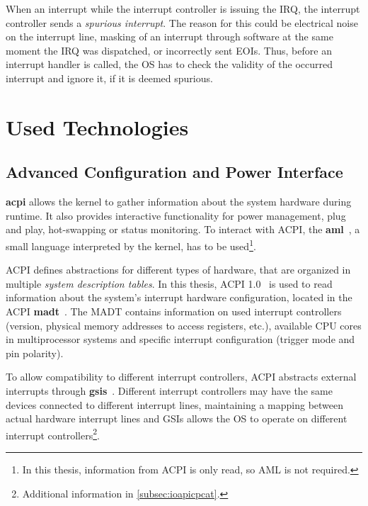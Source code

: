 When an interrupt  while the interrupt controller is issuing the IRQ, the interrupt controller sends a \textit{spurious interrupt}.
The reason for this could be electrical noise on the interrupt line, masking of an interrupt through software at the same moment the IRQ was dispatched, or incorrectly sent EOIs.
Thus, before an interrupt handler is called, the OS has to check the validity of the occurred interrupt and ignore it, if it is deemed spurious.

\section{Used Technologies}
\label{sec:technologies}

\subsection{Advanced Configuration and Power Interface}
\label{subsec:acpi}

\textbf{\gls{acpi}} allows the kernel to gather information about the system hardware during runtime.
It also provides interactive functionality for power management, plug and play, hot-swapping or status monitoring.
To interact with ACPI, the \textbf{\gls{aml}}~\autocite[sec.~16]{acpi1}, a small language interpreted by the kernel, has to be used\footnote{
  In this thesis, information from ACPI is only read, so AML is not required.}.

ACPI defines abstractions for different types of hardware, that are organized in multiple \textit{system description tables}.
In this thesis, ACPI 1.0~\autocite{acpi1} is used to read information about the system's interrupt hardware configuration, located in the ACPI \textbf{\gls{madt}}~\autocite[sec.~5.2.8]{acpi1}.
The MADT contains information on used interrupt controllers (version, physical memory addresses to access registers, etc.), available CPU cores in multiprocessor systems and specific interrupt configuration (trigger mode and pin polarity).

To allow compatibility to different interrupt controllers, ACPI abstracts external interrupts through \textbf{\glspl{gsi}}~\autocite[sec.~5.2.9]{acpi1}.
Different interrupt controllers may have the same devices connected to different interrupt lines, maintaining a mapping between actual hardware interrupt lines and GSIs allows the OS to operate on different interrupt controllers\footnote{
  Additional information in \autoref{subsec:ioapicpcat}.}.

